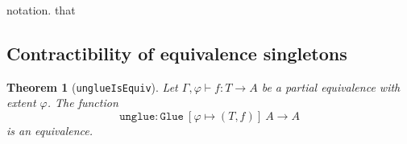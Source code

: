 \documentclass[12pt,a4paper,twoside,xetex]{book}
\newtheorem{theorem}{Theorem}[section]
\newcommand{\op}[1]{\mathtt{#1}}
\newcommand{\type}{\mathcal{U}}
\begin{document}
% 
% 
notation.
that 
% 
% 
% 

\subsection{Contractibility of equivalence singletons}

\begin{theorem}[\texttt{unglueIsEquiv}]
Let $\Gamma, \varphi \vdash f : T \rightarrow A$ be a partial equivalence with 
extent $\varphi$. The function $$ \op{unglue} : \op{Glue} \ \left[\varphi 
\mapsto (T,f) \right] \ A \rightarrow A$$ is an equivalence. 
\end{theorem}
\end{document}
